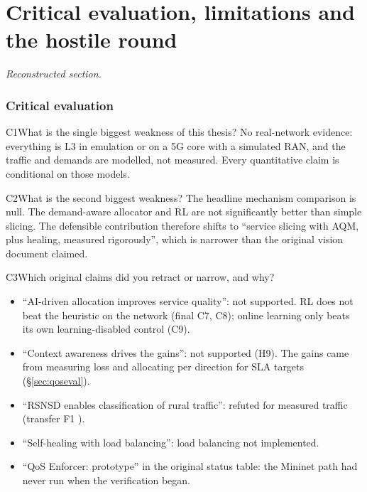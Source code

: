\part{Critical evaluation, limitations and the hostile round}
\textit{Reconstructed section.}

\section{Critical evaluation}

\begin{qa}{C1}{What is the single biggest weakness of this thesis?}
No real-network evidence: everything is L3 in emulation or on a 5G core with a simulated RAN, and the traffic and
demands are modelled, not measured. Every quantitative claim is conditional on those models.
\end{qa}

\begin{qa}{C2}{What is the second biggest weakness?}
The headline mechanism comparison is null. The demand-aware allocator and RL are not significantly better than simple
slicing. The defensible contribution therefore shifts to ``service slicing with AQM, plus healing, measured
rigorously'', which is narrower than the original vision document claimed.
\end{qa}

\begin{qa}{C3}{Which original claims did you retract or narrow, and why?}
\begin{itemize}
\item ``AI-driven allocation improves service quality'': not supported. RL does not beat the heuristic on the network
(final C7, C8); online learning only beats its own learning-disabled control (C9).
\item ``Context awareness drives the gains'': not supported (H9). The gains came from measuring loss and allocating
per direction for SLA targets (\S\ref{sec:qoseval}).
\item ``RSNSD enables classification of rural traffic'': refuted for measured traffic (transfer F1 \NTrZero).
\item ``Self-healing with load balancing'': load balancing not implemented.
\item ``QoS Enforcer: prototype'' in the original status table: the Mininet path had never run when the verification
began.
\end{itemize}
\end{qa}

